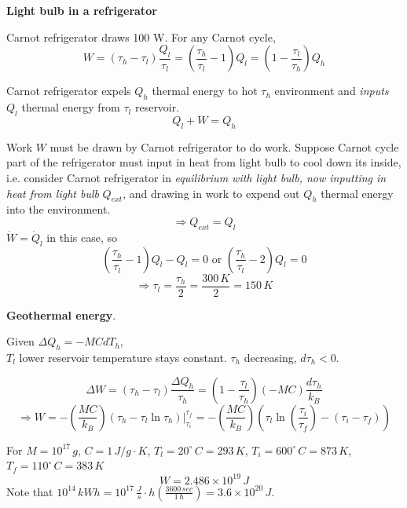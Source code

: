 \documentclass[twoside]{amsart}
\theoremstyle{plain}
\theoremstyle{definition}
\newcommand{\solutionhead}[1]
  {
   \noindent{\small\bf Solution #1.}
   }
\begin{document}
\solutionhead{7} \textbf{Light bulb in a refrigerator}

Carnot refrigerator draws 100 W.  For any Carnot cycle,
\[
W = (\tau_h - \tau_l) \frac{Q_l}{\tau_l} = \left( \frac{\tau_h }{\tau_l } - 1 \right) Q_l = \left( 1 - \frac{\tau_l }{\tau_h} \right) Q_h 
\]

Carnot refrigerator expels $Q_h$ thermal energy to hot $\tau_h$ environment and \emph{inputs} $Q_l$ thermal energy from $\tau_l$ reservoir.  
\[
Q_l + W = Q_h
\]

Work $W$ must be drawn by Carnot refrigerator to do work.  Suppose Carnot cycle part of the refrigerator must input in heat from light bulb to cool down its inside, i.e. consider Carnot refrigerator in \emph{equilibrium with light bulb, now inputting in heat from light bulb} $Q_{ext}$, and drawing in work to expend out $Q_h$ thermal energy into the environment.  
\[
\Longrightarrow \boxed{ Q_{ext} = Q_l }
\]
$\dot{W} = \dot{Q}_l$ in this case, so 
\[
\left( \frac{\tau_h}{\tau_l } - 1 \right) Q_l - Q_l = 0 \text{ or } \left( \frac{\tau_h }{\tau_l } - 2 \right) Q_l = 0 
\]
\[
\Longrightarrow \boxed{ \tau_l = \frac{\tau_h}{2} } = \frac{300 \, K}{2} = 150 \, K
\]











\solutionhead{8} \textbf{Geothermal energy}.  

Given $\Delta Q_h = -MC dT_h$, \\
$T_l$ lower reservoir temperature stays constant.   $\tau_h$ decreasing, $d\tau_h < 0$.  

\[
\Delta W = (\tau_h - \tau_l ) \frac{\Delta Q_h}{\tau_h} = \left( 1 - \frac{\tau_l}{\tau_h} \right) (-MC) \frac{d\tau_h }{k_B} 
\]
\[
\Longrightarrow W = - \left( \frac{MC}{k_B} \right) \left. ( \tau_h - \tau_l \ln{ \tau_h } ) \right|_{\tau_i}^{\tau_f} = - \left( \frac{MC}{k_B} \right) \left( \tau_l \ln{ \left( \frac{\tau_i }{\tau_f} \right)} - (\tau_i - \tau_f ) \right) 
\]

For $M = 10^{17} \, g$, $C = 1 \, J/g\cdot K$, $T_l = 20^{\circ} \, C = 293 \, K$, $T_i = 600^{\circ} \, C = 873 \, K$, $T_f = 110^{\circ} \, C = 383 \, K$
\[
W = 2.486 \times 10^{19} \, J
\]
Note that $10^{14} \, kWh = 10^{17} \, \frac{J}{s} \cdot h \left( \frac{3600 \, sec}{1 \, h }\right) = 3.6\times 10^{20} \, J$.  
\end{document}
